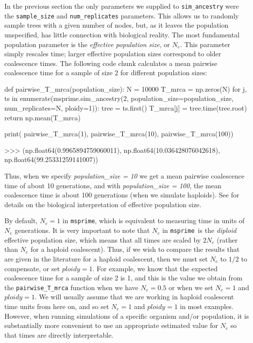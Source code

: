 \documentclass[graybox]{svmult}
\newcommand{\msprime}[0]{\texttt{msprime}}
\begin{document}
In the previous section the only parameters we supplied to
\texttt{sim\_ancestry} were the \texttt{sample\_size} and
\texttt{num\_replicates} parameters. This allows us to randomly sample
trees with a given number of nodes, but, as it leaves the population
unspecified, has little connection with
biological reality. The most fundamental population parameter is the \emph{effective population size}, or
\(N_e\). This parameter simply rescales time; larger effective
population sizes correspond to older coalescence times. The following code chunk
calculates a mean pairwise coalescence time for a sample of size 2 for different
population sizes:

\begin{pythoncode}
def pairwise_T_mrca(population_size):
    N = 10000
    T_mrca = np.zeros(N)
    for j, ts in enumerate(msprime.sim_ancestry(2,
                            population_size=population_size,
                            num_replicates=N, ploidy=1)):
        tree = ts.first()
        T_mrca[j] = tree.time(tree.root)
    return np.mean(T_mrca)

print(
    pairwise_T_mrca(1), pairwise_T_mrca(10),
    pairwise_T_mrca(100))

>>> (np.float64(0.9965894759060011),
     np.float64(10.036428076042618),
     np.float64(99.25331259141007))

\end{pythoncode}

    Thus, when we specify \emph{population\_size = 10} we get a mean pairwise coalescence time of about
10 generations, and with \emph{population\_size = 100}, the mean coalescence time is about
100 generations (when we simulate haploids). See \cite{wakely2008coalescent} for details on the
biological interpretation of effective population size.

By default, \(N_e = 1\) in \msprime, which is equivalent to measuring
time in units of \(N_e\) generations. It is very important to note that
\(N_e\) in \msprime\ is the \emph{diploid} effective population size,
which means that all times are scaled by \(2N_e\) (rather than $N_e$ for a
haploid coalescent). Thus, if we wish to compare the results that are
given in the literature for a haploid coalescent, then we must set
\(N_e\) to $1/2$ to compensate, or set \(ploidy = 1\). For example, we know that the expected
coalescence time for a sample of size 2 is 1, and this is the value we
obtain from the \texttt{pairwise\_T\_mrca} function when we have
\(N_e = 0.5\) or when we set \(N_e = 1\) and \(ploidy = 1\). We will usually assume that we are working in haploid
coalescent time units from here on, and so set \(N_e = 1\) and \(ploidy = 1\) in most
examples. However, when running simulations of a specific organism and/or population, it
is substantially more convenient to use an appropriate estimated value
for \(N_e\) so that times are directly interpretable.
\end{document}
